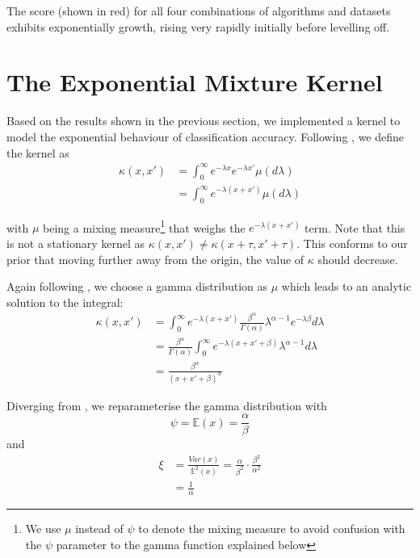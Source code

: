 \documentclass[a4paper,12pt,twoside,openright]{report}
\begin{document}
The score (shown in red) for all four combinations of algorithms and datasets exhibits exponentially growth, rising very rapidly initially before levelling off.





\section{The Exponential Mixture Kernel}

Based on the results shown in the previous section, we implemented a kernel to model the exponential behaviour of classification accuracy. Following \cite{2014arXiv1406.3896S}, we define the kernel as
\begin{align}
\kappa(x,x') &= \int_{0}^{\infty} e^{-\lambda x}e^{-\lambda x'}\mu(d\lambda)\\
&= \int_{0}^{\infty} e^{-\lambda(x+x')}\mu(d\lambda)
\end{align}



with $\mu$ being a mixing measure\footnote{We use $\mu$ instead of $\psi$ to denote the mixing measure to avoid confusion with the $\psi$ parameter to the gamma function explained below} that weighs the $e^{-\lambda(x+x')}$ term. Note that this is not a stationary kernel as $\kappa(x, x') \neq \kappa(x + \tau, x' + \tau)$. This conforms to our prior that moving further away from the origin, the value of $\kappa$ should decrease.

Again following \cite{2014arXiv1406.3896S}, we choose a gamma distribution as $\mu$ which leads to an analytic solution to the integral:
\begin{align}
\kappa(x, x') &= \int_0^{\infty} e^{-\lambda(x+x')}\frac{\beta^\alpha}{\Gamma(\alpha)}\lambda^{\alpha -1}e^{-\lambda\beta} d\lambda\\
&=\frac{\beta^\alpha}{\Gamma(\alpha)}\int_0^\infty e^{-\lambda(x+x'+\beta)}\lambda^{\alpha-1}d\lambda\\
&=\frac{\beta^\alpha}{(x+x'+\beta)^\alpha}
\end{align}

Diverging from \cite{2014arXiv1406.3896S}, we reparameterise the gamma distribution with
\begin{equation}
\psi = \mathbb{E}(x) = \frac{\alpha}{\beta}
\end{equation}
and
\begin{align}
\xi &= \frac{Var(x)}{\mathbb{E}^2 (x)} = \frac{\alpha}{\beta^2} \cdot \frac{\beta^2}{\alpha^2}\\
&= \frac{1}{\alpha}
\end{align}
\end{document}
